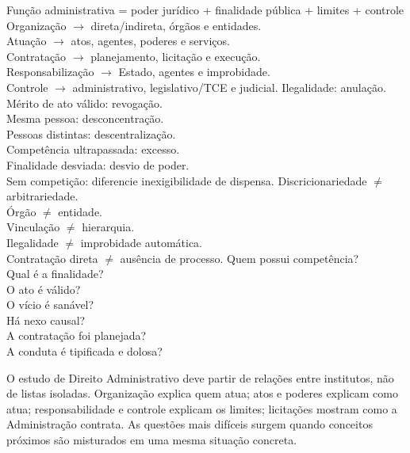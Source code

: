 {Função administrativa = poder jurídico + finalidade pública + limites + controle}
{Organização $\rightarrow$ direta/indireta, órgãos e entidades.\\Atuação $\rightarrow$ atos, agentes, poderes e serviços.\\Contratação $\rightarrow$ planejamento, licitação e execução.\\Responsabilização $\rightarrow$ Estado, agentes e improbidade.\\Controle $\rightarrow$ administrativo, legislativo/TCE e judicial.}
{Ilegalidade: anulação.\\Mérito de ato válido: revogação.\\Mesma pessoa: desconcentração.\\Pessoas distintas: descentralização.\\Competência ultrapassada: excesso.\\Finalidade desviada: desvio de poder.\\Sem competição: diferencie inexigibilidade de dispensa.}
{Discricionariedade $\neq$ arbitrariedade.\\Órgão $\neq$ entidade.\\Vinculação $\neq$ hierarquia.\\Ilegalidade $\neq$ improbidade automática.\\Contratação direta $\neq$ ausência de processo.}
{Quem possui competência?\\Qual é a finalidade?\\O ato é válido?\\O vício é sanável?\\Há nexo causal?\\A contratação foi planejada?\\A conduta é tipificada e dolosa?}

\begin{resumo}
O estudo de Direito Administrativo deve partir de relações entre institutos, não de listas isoladas. Organização explica quem atua; atos e poderes explicam como atua; responsabilidade e controle explicam os limites; licitações mostram como a Administração contrata. As questões mais difíceis surgem quando conceitos próximos são misturados em uma mesma situação concreta.
\end{resumo}
